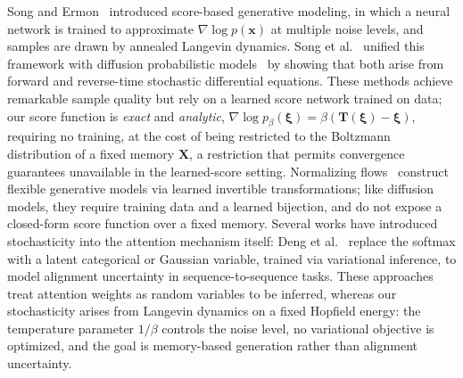 Song and Ermon~\cite{songGenerativeModelingEstimating2019} introduced score-based generative modeling, in which a neural network is trained to approximate $\nabla\log p(\mathbf{x})$ at multiple noise levels, and samples are drawn by annealed Langevin dynamics. Song et al.~\cite{songScoreBasedGenerativeModeling2021} unified this framework with diffusion probabilistic models~\cite{hoDenoisingDiffusionProbabilistic2020,sohlDicksteinDeepUnsupervisedLearning2015} by showing that both arise from forward and reverse-time stochastic differential equations. These methods achieve remarkable sample quality but rely on a learned score network trained on data; our score function is \emph{exact} and \emph{analytic}, $\nabla\log p_\beta(\boldsymbol{\xi}) = \beta(\mathbf{T}(\boldsymbol{\xi})-\boldsymbol{\xi})$, requiring no training, at the cost of being restricted to the Boltzmann distribution of a fixed memory $\mathbf{X}$, a restriction that permits convergence guarantees unavailable in the learned-score setting. Normalizing flows~\cite{rezendeMohamed2015} construct flexible generative models via learned invertible transformations; like diffusion models, they require training data and a learned bijection, and do not expose a closed-form score function over a fixed memory. Several works have introduced stochasticity into the attention mechanism itself: Deng et al.~\cite{dengLatentAlignment2018} replace the softmax with a latent categorical or Gaussian variable, trained via variational inference, to model alignment uncertainty in sequence-to-sequence tasks. These approaches treat attention weights as random variables to be inferred, whereas our stochasticity arises from Langevin dynamics on a fixed Hopfield energy: the temperature parameter $1/\beta$ controls the noise level, no variational objective is optimized, and the goal is memory-based generation rather than alignment uncertainty.